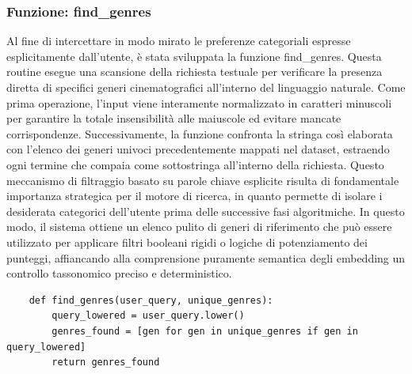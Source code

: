 \documentclass{article}
\begin{document}
\subsubsection{Funzione: find\_genres}
Al fine di intercettare in modo mirato le preferenze categoriali espresse esplicitamente dall'utente, \`e stata sviluppata la funzione find\_genres. Questa routine esegue una scansione della richiesta testuale per verificare la presenza diretta di specifici generi cinematografici all'interno del linguaggio naturale. Come prima operazione, l'input viene interamente normalizzato in caratteri minuscoli per garantire la totale insensibilit\`a alle maiuscole ed evitare mancate corrispondenze. Successivamente, la funzione confronta la stringa cos\`i elaborata con l'elenco dei generi univoci precedentemente mappati nel dataset, estraendo ogni termine che compaia come sottostringa all'interno della richiesta. Questo meccanismo di filtraggio basato su parole chiave esplicite risulta di fondamentale importanza strategica per il motore di ricerca, in quanto permette di isolare i desiderata categorici dell'utente prima delle successive fasi algoritmiche. In questo modo, il sistema ottiene un elenco pulito di generi di riferimento che pu\`o essere utilizzato per applicare filtri booleani rigidi o logiche di potenziamento dei punteggi, affiancando alla comprensione puramente semantica degli embedding un controllo tassonomico preciso e deterministico.
\begin{lstlisting}
	def find_genres(user_query, unique_genres):
		query_lowered = user_query.lower()
		genres_found = [gen for gen in unique_genres if gen in query_lowered]
		return genres_found
\end{lstlisting}
\end{document}
